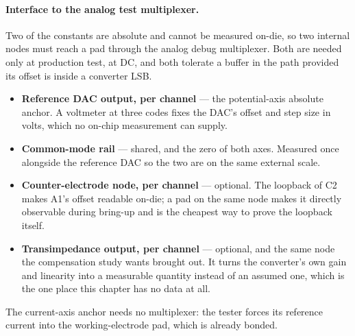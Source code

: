 \paragraph{Interface to the analog test multiplexer.} Two of the constants are
absolute and cannot be measured on-die, so two internal nodes must reach a pad
through the analog debug multiplexer. Both are needed only at production test,
at DC, and both tolerate a buffer in the path provided its offset is inside a
converter LSB.

\begin{itemize}[leftmargin=*, itemsep=2pt]
\item \textbf{Reference DAC output, per channel} --- the potential-axis absolute
  anchor. A voltmeter at three codes fixes the DAC's offset and step size in
  volts, which no on-chip measurement can supply.
\item \textbf{Common-mode rail} --- shared, and the zero of both axes. Measured
  once alongside the reference DAC so the two are on the same external scale.
\item \textbf{Counter-electrode node, per channel} --- optional. The loopback of
  C2 makes A1's offset readable on-die; a pad on the same node makes it directly
  observable during bring-up and is the cheapest way to prove the loopback
  itself.
\item \textbf{Transimpedance output, per channel} --- optional, and the same
  node the compensation study wants brought out. It turns the converter's own
  gain and linearity into a measurable quantity instead of an assumed one, which
  is the one place this chapter has no data at all.
\end{itemize}

\noindent The current-axis anchor needs no multiplexer: the tester forces its
reference current into the working-electrode pad, which is already bonded.
